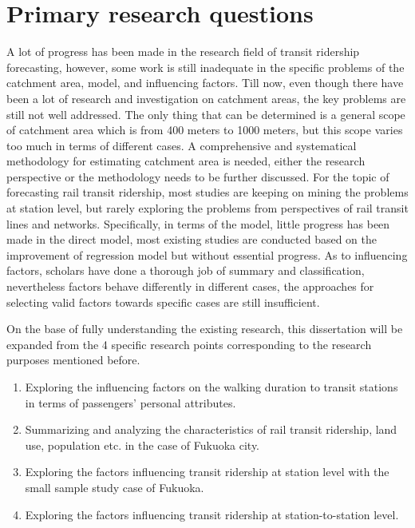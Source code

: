 %
\section{Primary research questions}
A lot of progress has been made in the research field of transit ridership forecasting, however, some work is still inadequate in the specific problems of the catchment area, model, and influencing factors. Till now, even though there have been a lot of research and investigation on catchment areas, the key problems are still not well addressed. The only thing that can be determined is a general scope of catchment area which is from 400 meters to 1000 meters, but this scope varies too much in terms of different cases. A comprehensive and systematical methodology for estimating catchment area is needed, either the research perspective or the methodology needs to be further discussed. For the topic of forecasting rail transit ridership, most studies are keeping on mining the problems at station level, but rarely exploring the problems from perspectives of rail transit lines and networks. Specifically, in terms of the model, little progress has been made in the direct model, most existing studies are conducted based on the improvement of regression model but without essential progress. As to influencing factors, scholars have done a thorough job of summary and classification, nevertheless factors behave differently in different cases, the approaches for selecting valid factors towards specific cases are still insufficient. 

On the base of fully understanding the existing research, this dissertation will be expanded from the 4 specific research points corresponding to the research purposes mentioned before.

\begin{enumerate}
	\setlength{\parskip}{0\baselineskip} %
	\item Exploring the influencing factors on the walking duration to transit stations in terms of passengers' personal attributes. 
	\item Summarizing and analyzing the characteristics of rail transit ridership, land use, population etc. in the case of Fukuoka city.
	\item Exploring the factors influencing transit ridership at station level with the small sample study case of Fukuoka. 
	\item Exploring the factors influencing transit ridership at station-to-station level.
	\setlength{\parskip}{0.7\baselineskip} %
\end{enumerate}


